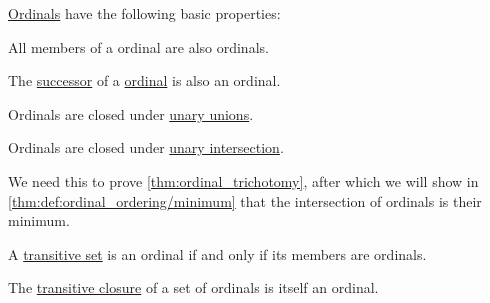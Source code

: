 \begin{proposition}\label{thm:def:ordinal}
  \hyperref[def:ordinal]{Ordinals} have the following basic properties:
  \begin{thmenum}
     All members of a ordinal are also ordinals.

     The \hyperref[def:ordinal_successor]{successor} of a \hyperref[def:ordinal]{ordinal} is also an ordinal.

     Ordinals are closed under \hyperref[def:set_union/unary]{unary unions}.

     Ordinals are closed under \hyperref[def:set_intersection/unary]{unary intersection}.

    We need this to prove \cref{thm:ordinal_trichotomy}, after which we will show in \cref{thm:def:ordinal_ordering/minimum} that the intersection of ordinals is their minimum.

     A \hyperref[def:transitive_set]{transitive set} is an ordinal if and only if its members are ordinals.

     The \hyperref[def:set_transitive_closure]{transitive closure} of a set of ordinals is itself an ordinal.
  \end{thmenum}
\end{proposition}
